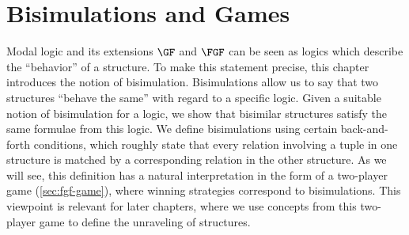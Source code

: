 \chapter{Bisimulations and Games}
Modal logic and its extensions $\GF$ and $\FGF$ can be seen as logics which describe the ``behavior'' of a structure.
To make this statement precise, this chapter introduces the notion of bisimulation.
Bisimulations allow us to say that two structures ``behave the same'' with regard to a specific logic.
Given a suitable notion of bisimulation for a logic, we show that bisimilar structures satisfy the same formulae from this logic.
We define bisimulations using certain back-and-forth conditions, which roughly state that every relation involving a tuple in one structure is matched by a corresponding relation in the other structure.
As we will see, this definition has a natural interpretation in the form of a two-player game (\cref{sec:fgf-game}), where winning strategies correspond to bisimulations.
This viewpoint is relevant for later chapters, where we use concepts from this two-player game to define the unraveling of structures.

